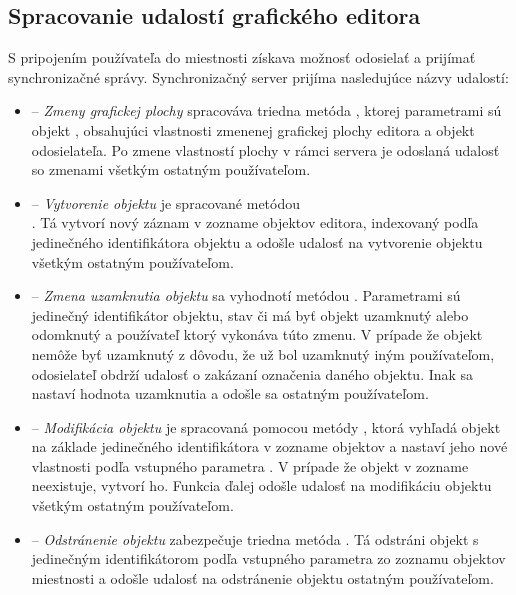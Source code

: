 \subsection{Spracovanie udalostí grafického editora}
S pripojením používateľa do miestnosti získava možnosť odosielať a prijímať synchronizačné správy. Synchronizačný server prijíma nasledujúce názvy udalostí:
\begin{itemize}
	
	\item {} -- \textit{Zmeny grafickej plochy} spracováva triedna metóda , ktorej parametrami sú objekt , obsahujúci vlastnosti zmenenej grafickej plochy editora a  objekt odosielateľa. Po zmene vlastností plochy v rámci servera je odoslaná udalosť so zmenami všetkým ostatným používateľom.
	
	\item {} -- \textit{Vytvorenie objektu} je spracované metódou \\. Tá vytvorí nový záznam v zozname objektov editora, indexovaný podľa jedinečného identifikátora objektu a odošle udalosť na vytvorenie objektu všetkým ostatným používateľom.
	
	\item {} -- \textit{Zmena uzamknutia objektu} sa vyhodnotí metódou . Parametrami sú jedinečný identifikátor objektu, stav či má byť objekt uzamknutý alebo odomknutý a používateľ ktorý vykonáva túto zmenu. V prípade že objekt nemôže byť uzamknutý z dôvodu, že už bol uzamknutý iným používateľom, odosielateľ obdrží udalosť o zakázaní označenia daného objektu. Inak sa nastaví hodnota uzamknutia a odošle sa ostatným používateľom.
	
	\item {} -- \textit{Modifikácia objektu} je spracovaná pomocou metódy , ktorá vyhľadá objekt na základe jedinečného identifikátora v zozname objektov a nastaví jeho nové vlastnosti podľa vstupného parametra . V prípade že objekt v zozname neexistuje, vytvorí ho. Funkcia ďalej odošle udalosť na modifikáciu objektu všetkým ostatným používateľom.
	
	\item {} -- \textit{Odstránenie objektu} zabezpečuje triedna metóda . Tá odstráni objekt s jedinečným identifikátorom podľa vstupného parametra zo zoznamu objektov miestnosti a odošle udalosť na odstránenie objektu ostatným používateľom.
	

\end{itemize}
